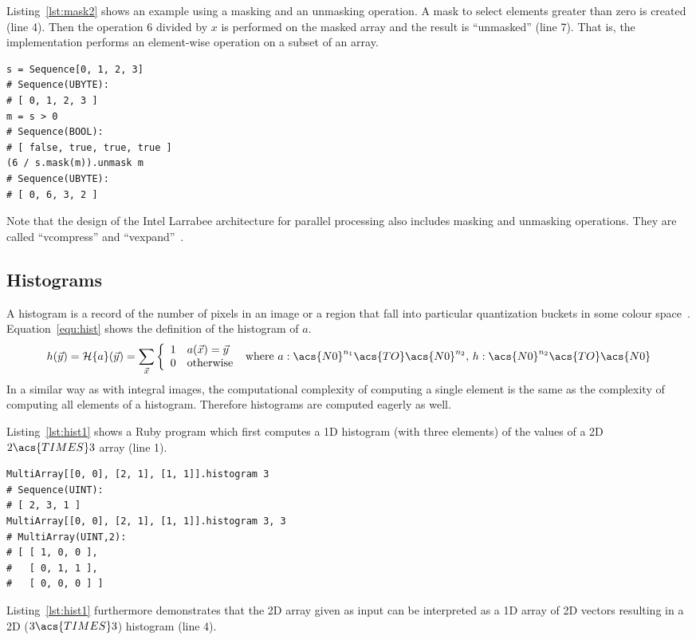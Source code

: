 \documentclass[12pt,a4paper,oneside,openright]{book}
\newcommand{\Ie}{That is, }
\newcommand{\equ}[1]{Equation~\ref{equ:#1}}
\newcommand{\lst}[1]{Listing~\ref{lst:#1}}
\begin{document}
\begin{CJK}{UTF8}{}
\lst{mask2} shows an example using a masking and an unmasking operation. A mask to select elements greater than zero is created (line 4). Then the operation $6$ divided by $x$ is performed on the masked array and the result is ``unmasked'' (line 7). \Ie the implementation performs an element-wise operation on a subset of an array.
\lstset{language=Ruby,frame=single,numbers=left}
\begin{lstlisting}[float,caption={Element-wise operation on a subset of an array},label=lst:mask2]
s = Sequence[0, 1, 2, 3]
# Sequence(UBYTE):
# [ 0, 1, 2, 3 ]
m = s > 0
# Sequence(BOOL):
# [ false, true, true, true ]
(6 / s.mask(m)).unmask m
# Sequence(UBYTE):
# [ 0, 6, 3, 2 ]
\end{lstlisting}

Note that the design of the Intel Larrabee architecture for parallel processing also includes masking and unmasking operations. They are called ``vcompress'' and ``vexpand''~\citep{abrash2009first}.

\subsection{Histograms}
A histogram is a record of the number of pixels in an image or a region that fall into particular quantization buckets in some colour space~\citep{RefWorks:40}. \equ{hist} shows the definition of the histogram of $a$.
\begin{equation}\label{equ:hist}
  h(\vec{y})=\mathcal{H}\{a\}(\vec{y})=\displaystyle\sum_{\vec{x}}\left\{\begin{array}{ll}1&a(\vec{x})=\vec{y}\\0&\mathrm{otherwise}\end{array}\right.\mathrm{\ where\ }
a:\acs{N0}^{n_1}\acs{TO}\acs{N0}^{n_2}\mathrm{,\ }
h:\acs{N0}^{n_2}\acs{TO}\acs{N0}
\end{equation}
In a similar way as with integral images, the computational complexity of computing a single element is the same as the complexity of computing all elements of a histogram. Therefore histograms are computed eagerly as well.

\lst{hist1} shows a Ruby program which first computes a \ac{1D} histogram (with three elements) of the values of a \ac{2D} $2\acs{TIMES} 3$ array (line 1).
\lstset{language=Ruby,frame=single,numbers=left}
\begin{lstlisting}[float,caption={Two-dimensional histogram},label=lst:hist1]
MultiArray[[0, 0], [2, 1], [1, 1]].histogram 3
# Sequence(UINT):
# [ 2, 3, 1 ]
MultiArray[[0, 0], [2, 1], [1, 1]].histogram 3, 3
# MultiArray(UINT,2):
# [ [ 1, 0, 0 ],
#   [ 0, 1, 1 ],
#   [ 0, 0, 0 ] ]
\end{lstlisting}
\lst{hist1} furthermore demonstrates that the \ac{2D} array given as input can be interpreted as a \ac{1D} array of \ac{2D} vectors resulting in a \ac{2D} ($3\acs{TIMES} 3$) histogram (line 4).


\end{CJK}
\end{document}
